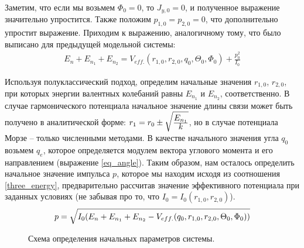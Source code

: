 Заметим, что если мы возьмем $\Phi_0 = 0$, то $J_{y, 0} = 0$, и полученное выражение значительно упростится. Также положим $p_{1,0} = p_{2,0} = 0$, что дополнительно упростит выражение.
Приходим к выражению, аналогичному тому, что было выписано для предыдущей модельной системы:
\vverh
\begin{gather}
E_n + E_{n_1} + E_{n_2} = V_{eff.}(r_{1,0}, r_{2,0}, q_0, \Theta_0, \Phi_0) + \frac{p_0^2}{I_0}
\label{three_energy}
\end{gather}

Используя полуклассический подход, определим начальные значения $r_{1, 0}$, $r_{2, 0}$, при которых энергии валентных колебаний равны $E_{n_1}$ и $E_{n_2}$, соответственно. В случае гармонического потенциала начальное значение длины связи может быть получено в аналитической форме:  $r_1 = r_0 \pm \sqrt{\frac{\displaystyle E_{n_1}}{\displaystyle k}}$, но в случае потенциала Морзе -- только численными методами. 
В качестве начального значения угла $q_0$ возьмем $q_e$, которое определяется модулем вектора углового момента и его направлением (выражение \eqref{eq_angle}). Таким образом, нам осталось определить начальное значение импульса $p$, которое мы находим исходя из соотношения \eqref{three_energy}, предварительно рассчитав значение эффективного потенциала при заданных условиях (не забывая про то, что $I_0 = I_0 (r_{1,0}, r_{2,0})$).
\vverh
\begin{gather}
p = \sqrt{I_0 (E_n + E_{n_1} + E_{n_2} - V_{eff.} (q_0, r_{1,0}, r_{2,0}, \Theta_0, \Phi_0))} \notag
\end{gather}

\vverh
\begin{figure}[H]
  \begin{center}
    \caption{Схема определения начальных параметров системы.}
  \end{center}
\end{figure}

